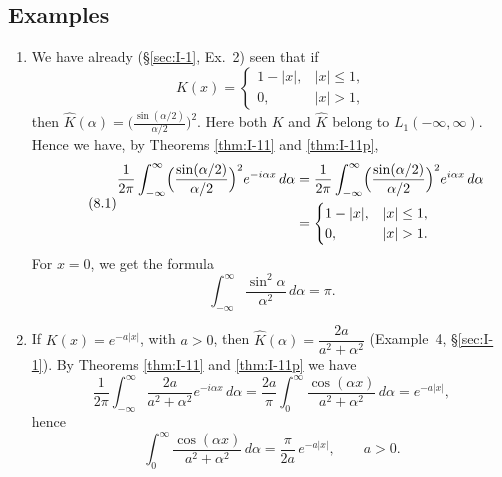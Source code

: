 \subsection*{Examples}
\begin{enumerate}[label=\arabic*.,ref=\arabic*]
\item We have already (\S\ref{sec:I-1}, Ex.~2) seen that if
\begin{equation*}
K(x)=
\begin{cases}
1-|x|,&|x|\le 1,\\
0,&|x|>1,
\end{cases}
\end{equation*}
then $\hat K(\alpha)=\bigl(\frac{\sin(\alpha/2)}{\alpha/2}\bigr)^2$. Here both $K$ and $\hat K$ belong to $L_1(-\infty,\infty)$. Hence we have, by Theorems \ref{thm:I-11} and \ref{thm:I-11p},
\begin{equation}\label{eq:I-8.1}\tag{8.1}
\begin{aligned}
\frac{1}{2\pi}\int_{-\infty}^{\infty}\Bigl(\frac{\sin(\alpha/2)}{\alpha/2}\Bigr)^{2}e^{-i\alpha x}\,d\alpha
&=\frac{1}{2\pi}\int_{-\infty}^{\infty}\Bigl(\frac{\sin(\alpha/2)}{\alpha/2}\Bigr)^{2}e^{i\alpha x}\,d\alpha\\
&=
\begin{cases}
1-|x|,&|x|\le 1,\\
0,&|x|>1.
\end{cases}
\end{aligned}
\end{equation}
For $x=0$, we get the formula
\begin{equation}\label{eq:I-8.2}\tag{8.2}
\int_{-\infty}^{\infty}\frac{\sin^{2}\alpha}{\alpha^{2}}\,d\alpha=\pi.
\end{equation}

\item If $K(x)=e^{-a|x|}$, with $a>0$, then $\hat K(\alpha)=\dfrac{2a}{a^{2}+\alpha^{2}}$ (Example~4, \S\ref{sec:I-1}). By Theorems \ref{thm:I-11} and \ref{thm:I-11p} we have
\begin{equation*}
\frac{1}{2\pi}\int_{-\infty}^{\infty}\frac{2a}{a^{2}+\alpha^{2}}e^{-i\alpha x}\,d\alpha
=\frac{2a}{\pi}\int_{0}^{\infty}\frac{\cos(\alpha x)}{a^{2}+\alpha^{2}}\,d\alpha
=e^{-a|x|},
\end{equation*}
hence
\begin{equation}\label{eq:I-8.3}\tag{8.3}
\int_{0}^{\infty}\frac{\cos(\alpha x)}{a^{2}+\alpha^{2}}\,d\alpha=\frac{\pi}{2a}\,e^{-a|x|},\qquad a>0.
\end{equation}


\end{enumerate}
